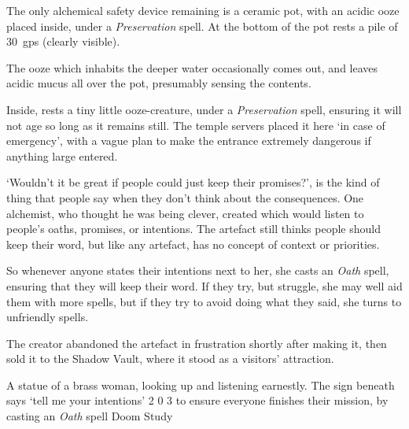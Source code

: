 The only alchemical safety device remaining is a ceramic pot, with an acidic ooze placed inside, under a \textit{Preservation} spell.
At the bottom of the pot rests a pile of 30~\glspl{gp} (clearly visible).

The ooze which inhabits the deeper water  occasionally comes out, and leaves acidic mucus all over the pot, presumably sensing the contents.

Inside, rests a tiny little ooze-creature, under a \textit{Preservation} spell, ensuring it will not age so long as it remains still.
The temple \glspl{server} placed it here `in case of emergency', with a vague plan to make the entrance extremely dangerous if anything large entered.



\begin{exampletext}
  `Wouldn't it be great if people could just keep their promises?', is the kind of thing that people say when they don't think about the consequences.
  One alchemist, who thought he was being clever, created  which would listen to people's oaths, promises, or intentions.
  The \gls{artefact} still thinks people should keep their word, but like any \gls{artefact}, has no concept of context or priorities.

  So whenever anyone states their intentions next to her, she casts an \textit{Oath} spell, ensuring that they will keep their word.
  If they try, but struggle, she may well aid them with more spells, but if they try to avoid doing what they said, she turns to unfriendly spells.

  The creator abandoned the \gls{artefact} in frustration shortly after making it, then sold it to the Shadow Vault, where it stood as a visitors' attraction.
\end{exampletext}

  {A statue of a brass woman, looking up and listening earnestly.
  The sign beneath says `tell me your intentions'}%
  {2}%
  {0}%
  {3}%
  {to ensure everyone finishes their mission, by casting an \textit{Oath} spell}%
  {Doom Study}%
  {
    \setcounter{Fate}{2}
    \setcounter{Water}{2}
    \setcounter{Empathy}{2}
    \setcounter{Wyldcrafting}{1}
  }%

\showStdSpells[
  \setcounter{diceNo}{0}
]

